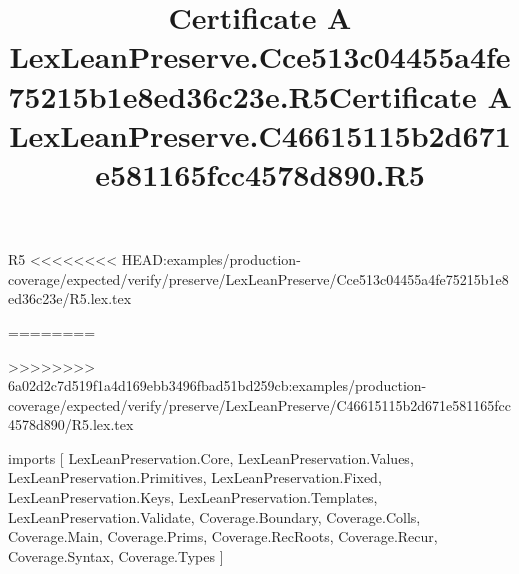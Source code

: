 \begin{lexlean}{R5}
<<<<<<<< HEAD:examples/production-coverage/expected/verify/preserve/LexLeanPreserve/Cce513c04455a4fe75215b1e8ed36c23e/R5.lex.tex
\title{Certificate A LexLeanPreserve.Cce513c04455a4fe75215b1e8ed36c23e.R5}
========
\title{Certificate A LexLeanPreserve.C46615115b2d671e581165fcc4578d890.R5}
>>>>>>>> 6a02d2c7d519f1a4d169ebb3496fbad51bd259cb:examples/production-coverage/expected/verify/preserve/LexLeanPreserve/C46615115b2d671e581165fcc4578d890/R5.lex.tex
\begin{coremodule}
imports [
  LexLeanPreservation.Core,
  LexLeanPreservation.Values,
  LexLeanPreservation.Primitives,
  LexLeanPreservation.Fixed,
  LexLeanPreservation.Keys,
  LexLeanPreservation.Templates,
  LexLeanPreservation.Validate,
  Coverage.Boundary,
  Coverage.Colls,
  Coverage.Main,
  Coverage.Prims,
  Coverage.RecRoots,
  Coverage.Recur,
  Coverage.Syntax,
  Coverage.Types
]


\end{coremodule}
\end{lexlean}
